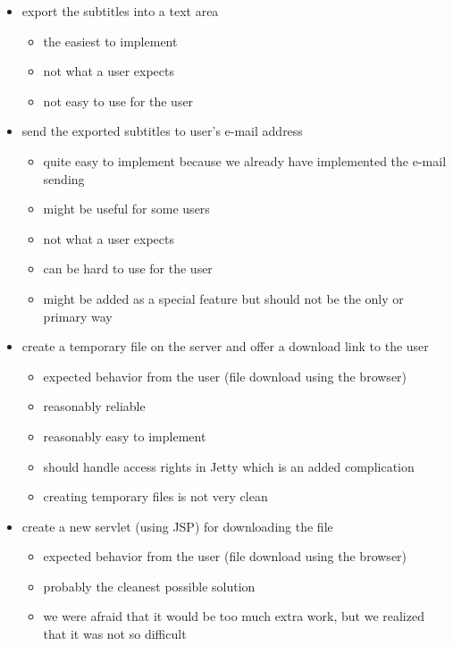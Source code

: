 \begin{itemize}

\item export the subtitles into a text area
\begin{itemize}
\item the easiest to implement
\item not what a user expects
\item not easy to use for the user
\end{itemize}

\item send the exported subtitles to user's e-mail address
\begin{itemize}
\item quite easy to implement because we already have implemented the e-mail sending
\item might be useful for some users
\item not what a user expects
\item can be hard to use for the user
\item might be added as a special feature but should not be the only or primary way
\end{itemize}

\item create a temporary file on the server and offer a download link to the user
\begin{itemize}
\item expected behavior from the user (file download using the browser)
\item reasonably reliable
\item reasonably easy to implement
\item should handle access rights in Jetty which is an added complication
\item creating temporary files is not very clean
\end{itemize}

\item create a new servlet (using JSP) for downloading the file
\begin{itemize}
\item expected behavior from the user (file download using the browser)
\item probably the cleanest possible solution
\item we were afraid that it would be too much extra work, but we realized that it was not so difficult
\end{itemize}

\end{itemize}

